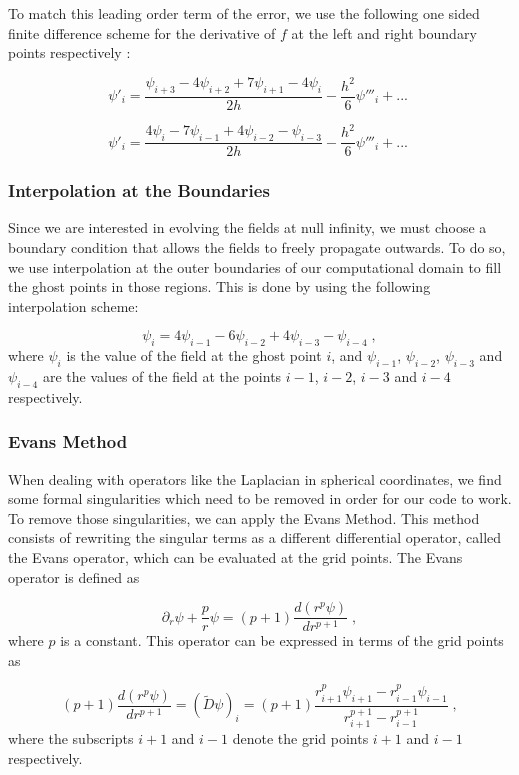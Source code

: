 To match this leading order term of the error, we use the following one sided finite difference scheme for the derivative of $f$ at the left and right boundary points respectively \cite{}:

\begin{equation}
    \psi'_i = \frac{\psi_{i+3} - 4 \psi_{i+2} + 7 \psi_{i+1} - 4 \psi_{i}}{2h} - \frac{h^2}{6} \psi'''_i + ...\;
\end{equation}

\begin{equation}
    \psi'_i = \frac{4 \psi_{i} - 7 \psi_{i-1} + 4 \psi_{i-2} - \psi_{i-3}}{2h} - \frac{h^2}{6} \psi'''_i + ...\;
\end{equation}

\subsubsection{Interpolation at the Boundaries}

Since we are interested in evolving the fields at null infinity, we must choose a boundary condition that allows the fields to freely propagate outwards. To do so, we use interpolation at the outer boundaries of our computational domain to fill the ghost points in those regions. This is done by using the following interpolation scheme:

\begin{equation}
    \psi_i = 4 \psi_{i-1} - 6 \psi_{i-2} + 4 \psi_{i-3} - \psi_{i-4} \; ,
\end{equation}
%
where $\psi_i$ is the value of the field at the ghost point $i$, and $\psi_{i-1}$, $\psi_{i-2}$, $\psi_{i-3}$ and $\psi_{i-4}$ are the values of the field at the points $i-1$, $i-2$, $i-3$ and $i-4$ respectively.

\subsubsection{Evans Method}
When dealing with operators like the Laplacian in spherical coordinates, we find some formal singularities which need to be removed in order for our code to work. To remove those singularities, we can apply the Evans Method. This method consists of rewriting the singular terms as a different differential operator, called the Evans operator, which can be evaluated at the grid points. The Evans operator is defined as

\begin{equation}
    \partial_r \psi + \frac{p}{r}\psi = (p+1) \frac{d(r^p \psi)}{dr^{p+1}}\;,
\end{equation}
%
where $p$ is a constant. This operator can be expressed in terms of the grid points as 

\begin{equation}
    (p+1) \frac{d(r^p \psi)}{dr^{p+1}}=(\tilde{D}\psi)_i = (p+1)\frac{r^p_{i+1}\psi_{i+1}-r^p_{i-1}\psi_{i-1}}{r^{p+1}_{i+1}-r^{p+1}_{i-1}}\;,
\end{equation}
%
where the subscripts $i+1$ and $i-1$ denote the grid points $i+1$ and $i-1$ respectively.